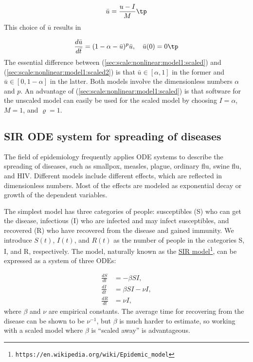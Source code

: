 \documentclass[graybox,envcountchap,sectrefs,final]{svmonodo}
\begin{document}
\[ \bar u = \frac{u-I}{M}\tp \]
This choice of $\bar u$ results in

\begin{equation}
\frac{d\bar u}{d\bar t} = (1 - \alpha - \bar u)^p \bar u,\quad
\bar u(0) =0\tp
\label{sec:scale:nonlinear:model1:scaled2}
\end{equation}
The essential difference between (\ref{sec:scale:nonlinear:model1:scaled})
and (\ref{sec:scale:nonlinear:model1:scaled2}) is that
$\bar u\in [\alpha, 1]$ in the former and $\bar u \in [0, 1-\alpha]$ in
the latter. Both models involve the dimensionless numbers $\alpha$ and $p$.
An advantage of (\ref{sec:scale:nonlinear:model1:scaled})
is that software for the unscaled model can easily be used for the
scaled model by choosing $I=\alpha$, $M=1$, and $\varrho=1$.

\subsection{SIR ODE system for spreading of diseases}

The field of epidemiology frequently applies ODE systems to describe
the spreading of diseases, such as smallpox, measles, plague, ordinary
flu, swine flu, and HIV. Different models include different effects,
which are reflected in dimensionless numbers. Most of the effects are
modeled as exponential decay or growth of the dependent variables.

The simplest model has three categories of people: susceptibles (S)
who can get the disease, infectious (I) who are infected and may
infect susceptibles, and recovered (R) who have recovered from the
disease and gained immunity. We introduce $S(t)$, $I(t)$, and $R(t)$
as the number of people in the categories S, I, and R, respectively.
The model, naturally known as the \href{{https://en.wikipedia.org/wiki/Epidemic_model}}{SIR model}\footnote{\texttt{https://en.wikipedia.org/wiki/Epidemic\_model}}, can be expressed as a
system of three ODEs:

\begin{align}
\frac{dS}{dt} &= - \beta SI,
\label{scale:SIR:S}\\ 
\frac{dI}{dt} &= \beta SI - \nu I,
\label{scale:SIR:I}\\ 
\frac{dR}{dt} &= \nu I,
\label{scale:SIR:R}
\end{align}
where $\beta$ and $\nu$ are empirical constants. The average time for recovering
from the disease can be shown to be $\nu^{-1}$, but $\beta$ is much harder
to estimate, so working with a scaled model where $\beta$ is ``scaled away''
is advantageous.
\end{document}
